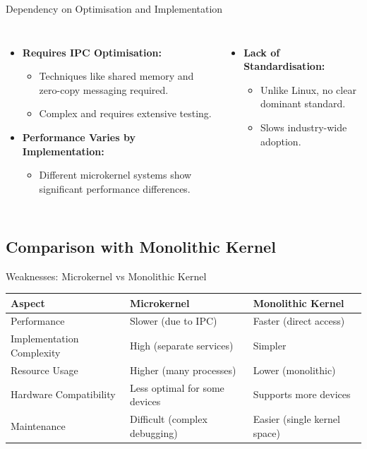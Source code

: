\documentclass[aspectratio=169, table]{beamer}
\begin{document}
\begin{frame}{\LARGE Dependency on Optimisation and Implementation}
\vspace{20pt}
\begin{columns}
\begin{itemize}
	\item \textbf{Requires IPC Optimisation:}
	\begin{itemize}
		\item Techniques like shared memory and zero-copy messaging required.
		\item Complex and requires extensive testing.
	\end{itemize}
	\item \textbf{Performance Varies by Implementation:}
	\begin{itemize}
		\item Different microkernel systems show significant performance differences.
	\end{itemize}
\end{itemize}
\begin{itemize}
	\item \textbf{Lack of Standardisation:}
	\begin{itemize}
		\item Unlike Linux, no clear dominant standard.
		\item Slows industry-wide adoption.
	\end{itemize}
\end{itemize}
\end{columns}
\end{frame}

\subsection{Comparison with Monolithic Kernel}

\begin{frame}{{\LARGE Weaknesses: Microkernel vs Monolithic Kernel}}
\vspace{20pt}
\setlength{\arrayrulewidth}{0.8pt}
\renewcommand{\arraystretch}{1.3}
\begin{table}[h]
\centering
\begin{tabular}{|p{}|p{}|p{}|}
	\hline
	\textbf{Aspect} & \textbf{Microkernel} & \textbf{Monolithic Kernel} \\
	\hline
	Performance & Slower (due to IPC) & Faster (direct access) \\
	Implementation Complexity & High (separate services) & Simpler \\
	Resource Usage & Higher (many processes) & Lower (monolithic) \\
	Hardware Compatibility & Less optimal for some devices & Supports more devices \\
	Maintenance & Difficult (complex debugging) & Easier (single kernel space) \\
	\hline
\end{tabular}
\label{tab:microkernel_vs_monolithic_weakness}
\end{table}
\end{frame}
\end{document}
